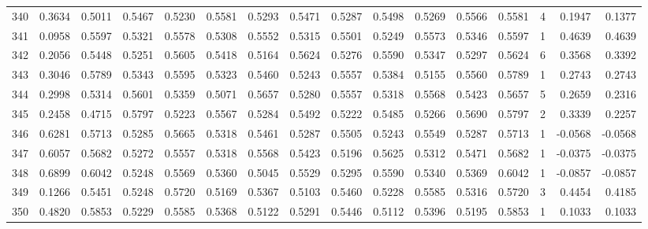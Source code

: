 \begin{tabular}{lrrrrrrrrrrrrrrr}
340 &      0.3634 &  0.5011 &  0.5467 &  0.5230 &  0.5581 &  0.5293 &  0.5471 &  0.5287 &  0.5498 &  0.5269 &   0.5566 &     0.5581 &      4 &                    0.1947 &                     0.1377 \\
341 &      0.0958 &  0.5597 &  0.5321 &  0.5578 &  0.5308 &  0.5552 &  0.5315 &  0.5501 &  0.5249 &  0.5573 &   0.5346 &     0.5597 &      1 &                    0.4639 &                     0.4639 \\
342 &      0.2056 &  0.5448 &  0.5251 &  0.5605 &  0.5418 &  0.5164 &  0.5624 &  0.5276 &  0.5590 &  0.5347 &   0.5297 &     0.5624 &      6 &                    0.3568 &                     0.3392 \\
343 &      0.3046 &  0.5789 &  0.5343 &  0.5595 &  0.5323 &  0.5460 &  0.5243 &  0.5557 &  0.5384 &  0.5155 &   0.5560 &     0.5789 &      1 &                    0.2743 &                     0.2743 \\
344 &      0.2998 &  0.5314 &  0.5601 &  0.5359 &  0.5071 &  0.5657 &  0.5280 &  0.5557 &  0.5318 &  0.5568 &   0.5423 &     0.5657 &      5 &                    0.2659 &                     0.2316 \\
345 &      0.2458 &  0.4715 &  0.5797 &  0.5223 &  0.5567 &  0.5284 &  0.5492 &  0.5222 &  0.5485 &  0.5266 &   0.5690 &     0.5797 &      2 &                    0.3339 &                     0.2257 \\
346 &      0.6281 &  0.5713 &  0.5285 &  0.5665 &  0.5318 &  0.5461 &  0.5287 &  0.5505 &  0.5243 &  0.5549 &   0.5287 &     0.5713 &      1 &                   -0.0568 &                    -0.0568 \\
347 &      0.6057 &  0.5682 &  0.5272 &  0.5557 &  0.5318 &  0.5568 &  0.5423 &  0.5196 &  0.5625 &  0.5312 &   0.5471 &     0.5682 &      1 &                   -0.0375 &                    -0.0375 \\
348 &      0.6899 &  0.6042 &  0.5248 &  0.5569 &  0.5360 &  0.5045 &  0.5529 &  0.5295 &  0.5590 &  0.5340 &   0.5369 &     0.6042 &      1 &                   -0.0857 &                    -0.0857 \\
349 &      0.1266 &  0.5451 &  0.5248 &  0.5720 &  0.5169 &  0.5367 &  0.5103 &  0.5460 &  0.5228 &  0.5585 &   0.5316 &     0.5720 &      3 &                    0.4454 &                     0.4185 \\
350 &      0.4820 &  0.5853 &  0.5229 &  0.5585 &  0.5368 &  0.5122 &  0.5291 &  0.5446 &  0.5112 &  0.5396 &   0.5195 &     0.5853 &      1 &                    0.1033 &                     0.1033 \\

\end{tabular}
